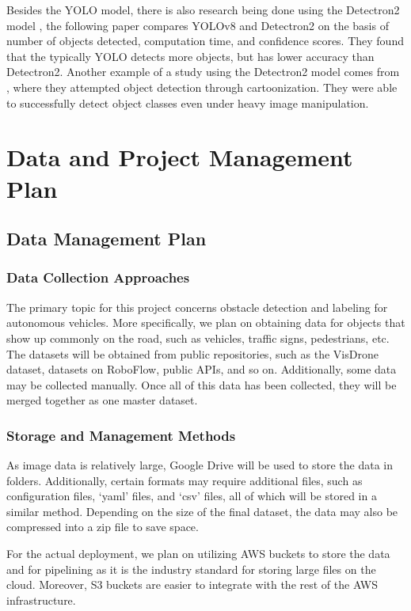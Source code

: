 \documentclass[stu,12pt,floatsintext]{apa7}
\begin{document}
Besides the YOLO model, there is also research being done using the Detectron2 model \parencite{wu2019detectron2}, the following paper \parencite{wadhwa_comparison_2023} compares YOLOv8 and Detectron2 on the basis of number of objects detected, computation time, and confidence scores. They found that the typically YOLO detects more objects, but has lower accuracy than Detectron2. Another example of a study using the Detectron2 model comes from \textcite{abhishek_detectron2_2021}, where they attempted object detection through cartoonization. They were able to successfully detect object classes even under heavy image manipulation.

\section{Data and Project Management Plan}
\subsection{Data Management Plan}
\subsubsection{Data Collection Approaches}
The primary topic for this project concerns obstacle detection and labeling for autonomous vehicles. More specifically, we plan on obtaining data for objects that show up commonly on the road, such as vehicles, traffic signs, pedestrians, etc.
The datasets will be obtained from public repositories, such as the VisDrone dataset, datasets on RoboFlow, public APIs, and so on. Additionally, some data may be collected manually. Once all of this data has been collected, they will be merged together as one master dataset.

\subsubsection{Storage and Management Methods}
As image data is relatively large, Google Drive will be used to store the data in folders. Additionally, certain formats may require additional files, such as configuration files, `yaml' files, and `csv' files, all of which will be stored in a similar method. Depending on the size of the final dataset, the data may also be compressed into a zip file to save space.

For the actual deployment, we plan on utilizing AWS buckets to store the data and for pipelining as it is the industry standard for storing large files on the cloud. Moreover, S3 buckets are easier to integrate with the rest of the AWS infrastructure.
\end{document}
